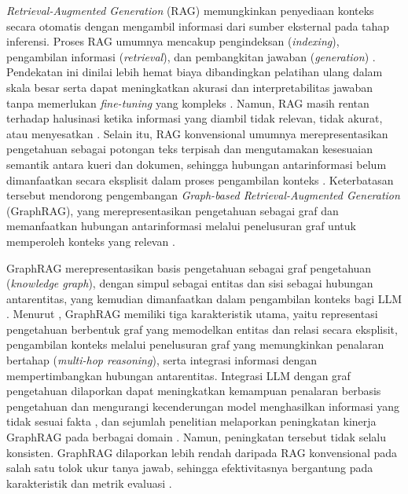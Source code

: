 \emph{Retrieval-Augmented Generation} (RAG) \autocite{Lewis2020} memungkinkan penyediaan konteks secara otomatis dengan mengambil informasi dari sumber eksternal pada tahap inferensi. Proses RAG umumnya mencakup pengindeksan (\emph{indexing}), pengambilan informasi (\emph{retrieval}), dan pembangkitan jawaban (\emph{generation}) \autocite{YizhengHuang2026, WangXL2026}. Pendekatan ini dinilai lebih hemat biaya dibandingkan pelatihan ulang dalam skala besar \autocite{YizhengHuang2026} serta dapat meningkatkan akurasi dan interpretabilitas jawaban tanpa memerlukan \emph{fine-tuning} yang kompleks \autocite{DelaCruzCabello2025}. Namun, RAG masih rentan terhadap halusinasi ketika informasi yang diambil tidak relevan, tidak akurat, atau menyesatkan \autocite{YizhengHuang2026, Huang2025}. Selain itu, RAG konvensional umumnya merepresentasikan pengetahuan sebagai potongan teks terpisah dan mengutamakan kesesuaian semantik antara kueri dan dokumen, sehingga hubungan antarinformasi belum dimanfaatkan secara eksplisit dalam proses pengambilan konteks \autocite{WangXL2026, Syeda2026}. Keterbatasan tersebut mendorong pengembangan \emph{Graph-based Retrieval-Augmented Generation} (GraphRAG), yang merepresentasikan pengetahuan sebagai graf dan memanfaatkan hubungan antarinformasi melalui penelusuran graf untuk memperoleh konteks yang relevan \autocite{WangXL2026, Syeda2026}.

GraphRAG merepresentasikan basis pengetahuan sebagai graf pengetahuan (\emph{knowledge graph}), dengan simpul sebagai entitas dan sisi sebagai hubungan antarentitas, yang kemudian dimanfaatkan dalam pengambilan konteks bagi LLM \autocite{WangXL2026, Syeda2026}. Menurut \textcite{Zhu2026}, GraphRAG memiliki tiga karakteristik utama, yaitu representasi pengetahuan berbentuk graf yang memodelkan entitas dan relasi secara eksplisit, pengambilan konteks melalui penelusuran graf yang memungkinkan penalaran bertahap (\emph{multi-hop reasoning}), serta integrasi informasi dengan mempertimbangkan hubungan antarentitas. Integrasi LLM dengan graf pengetahuan dilaporkan dapat meningkatkan kemampuan penalaran berbasis pengetahuan dan mengurangi kecenderungan model menghasilkan informasi yang tidak sesuai fakta \autocite{Pan2024}, dan sejumlah penelitian melaporkan peningkatan kinerja GraphRAG pada berbagai domain \autocite{Zhou2026, Ali2026, BenKhalifa2026, Kamalipour2026}. Namun, peningkatan tersebut tidak selalu konsisten. GraphRAG dilaporkan lebih rendah daripada RAG konvensional pada salah satu tolok ukur tanya jawab, sehingga efektivitasnya bergantung pada karakteristik dan metrik evaluasi \autocite{Yang2025}.

